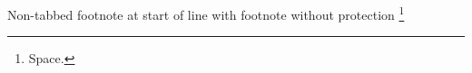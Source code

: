 \documentclass{article}
\begin{document}
Non-tabbed footnote at start of line with footnote without protection
\footnote{Space.}
\end{document}
